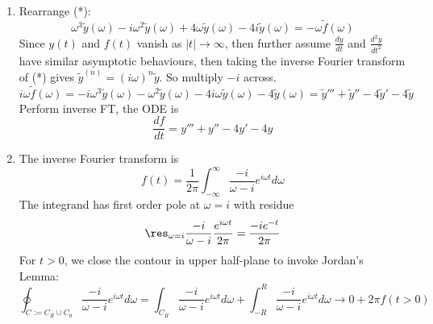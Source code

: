 \documentclass[a4paper]{article}
\begin{document}
\begin{ans}\leavevmode
\begin{enumerate}[label=(\alph*)]
\item Rearrange (*):
$$\omega^3\tilde{y}(\omega)-i\omega^2\tilde{y}(\omega)+4\omega \tilde{y}(\omega)-4i\tilde{y}(\omega)=-\omega\tilde{f}(\omega)$$
Since $y(t)$ and $f(t)$ vanish as $|t|\rightarrow\infty$, then further assume $\frac{dy}{dt}$ and $\frac{d^2y}{dt^2}$ have similar asymptotic behaviours, then taking the inverse Fourier transform of (*) gives $\tilde{y}^{(n)}=(i\omega)^n\tilde{y}$. So multiply $-i$ across.
$$i\omega\tilde{f}(\omega)=-i\omega^3\tilde{y}(\omega)-\omega^2\tilde{y}(\omega)-4i\omega \tilde{y}(\omega)-4\tilde{y}(\omega)=\tilde{y}'''+\tilde{y}''-4\tilde{y}'-4\tilde{y}$$
Perform inverse FT, the ODE is
$$\frac{df}{dt}=y'''+y''-4y'-4y$$
\item The inverse Fourier transform is
$$f(t)=\frac{1}{2\pi}\int_{-\infty}^\infty\frac{-i}{\omega-i}e^{i\omega t}d\omega$$
The integrand has first order pole at $\omega=i$ with residue
$$\res_{\omega=i}\frac{-i}{\omega-i}\frac{e^{i\omega t}}{2\pi}=\frac{-ie^{-t}}{2\pi}$$
For $t>0$, we close the contour in upper half-plane to invoke Jordan's Lemma:
$$\oint_{C:=C_R\cup C_0}\frac{-i}{\omega-i}e^{i\omega t}d\omega=\int_{C_R}\frac{-i}{\omega-i}e^{i\omega t}d\omega+\int_{-R}^R\frac{-i}{\omega-i}e^{i\omega t}d\omega\rightarrow 0+2\pi f(t>0)$$
\begin{center}
\end{center}
\end{enumerate}
\end{ans}
\end{document}
